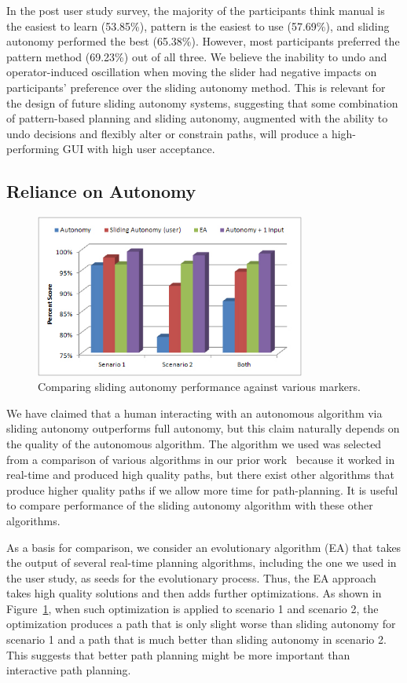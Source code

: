 \documentclass[lettersize, apacite, twoside, HRI]{apa_HRI}
\begin{document}
In the post user study survey, the majority of the participants think manual is the easiest to learn (53.85\%), pattern is the easiest to use (57.69\%), and sliding autonomy performed the best (65.38\%). However, most participants preferred the pattern method (69.23\%) out of all three. We believe the inability to undo and operator-induced oscillation when moving the slider had negative impacts on participants' preference over the sliding autonomy method. This is relevant for the design of future sliding autonomy systems, suggesting that some combination of pattern-based planning and sliding autonomy, augmented with the ability to undo decisions and flexibly alter or constrain paths, will produce a high-performing GUI with high user acceptance.

\subsection{Reliance on Autonomy}
\label{Reliance}

\begin{figure}
\centering
\includegraphics[width=3.5in]{PerformanceMarkers.JPG}
\caption{Comparing sliding autonomy performance against various markers.}
\label{PerformanceMarkers}
\end{figure}

We have claimed that a human interacting with an autonomous algorithm via sliding autonomy outperforms full autonomy, but this claim naturally depends on the quality of the autonomous algorithm. The algorithm we used was selected from a comparison of various algorithms in our prior work~\cite{Lin2009UAV,Lin2014Hierarchical} because it worked in real-time and produced high quality paths, but there exist other algorithms that produce higher quality paths if we allow more time for path-planning. It is useful to compare performance of the sliding autonomy algorithm with these other algorithms.

As a basis for comparison, we consider an evolutionary algorithm  (EA) that takes the output of several real-time planning algorithms, including the one we used in the user study, as seeds for the evolutionary process. Thus, the EA approach takes high quality solutions and then adds further optimizations. As shown in Figure~\ref{PerformanceMarkers}, when such optimization is applied to scenario 1 and scenario 2, the optimization produces a path that is only slight worse than sliding autonomy for scenario 1 and a path that is much better than sliding autonomy in scenario 2. This suggests that better path planning might be more important than interactive path planning.
\end{document}
